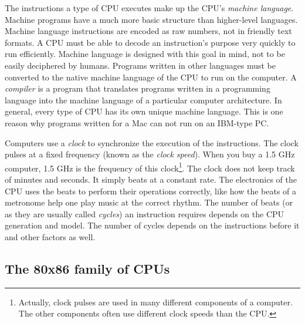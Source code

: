 The instructions a type of CPU executes make up the CPU's
\emph{machine language}.  Machine programs
have a much more basic structure than higher-level languages. Machine
language instructions are encoded as raw numbers, not in friendly text
formats. A CPU must be able to decode an instruction's purpose very
quickly to run efficiently. Machine language is designed with this
goal in mind, not to be easily deciphered by humans. Programs written
in other languages must be converted to the native machine language of
the CPU to run on the computer. A \emph{compiler}  is
a program that translates programs written in a programming language
into the machine language of a particular computer architecture. In
general, every type of CPU has its own unique machine language. This
is one reason why programs written for a Mac can not run on an
IBM-type PC.

Computers use a \emph{clock}  to synchronize the
execution of the  instructions.  The clock pulses at a fixed frequency
(known as the \emph{clock speed}). When you buy a 1.5 GHz computer,
1.5 GHz is the frequency of this clock\footnote{Actually, clock pulses
are used in many different components of a computer. The other
components often use different clock speeds than the CPU.}. The clock
does not keep track of minutes and seconds. It simply beats at a
constant rate. The electronics of the CPU uses the beats to perform
their operations correctly, like how the beats of a metronome help one
play music at the correct rhythm.  The number of beats (or as they are
usually called \emph{cycles}) an instruction requires depends on the
CPU generation and model. The number of cycles depends on the
instructions before it and other factors as well.


\subsection{The 80x86 family of CPUs}

